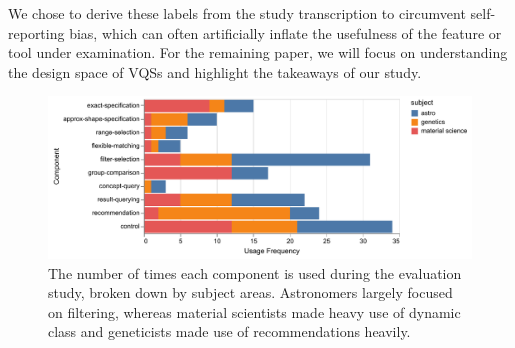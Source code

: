 We chose to derive these labels from the study transcription to circumvent self-reporting bias, which can often artificially inflate the usefulness of the feature or tool under examination. For the remaining paper, we will focus on understanding the design space of VQSs and highlight the takeaways of our study.%
\begin{figure}[h!]
  \includegraphics[width=\linewidth]{figures/usagefreqbysubject.pdf}
  \caption{The number of times each component is used during the evaluation study, broken down by subject areas. Astronomers largely focused on filtering, whereas material scientists made heavy use of dynamic class and geneticists made use of recommendations heavily.}\label{fig:usagefreqbysubject}
\end{figure}
